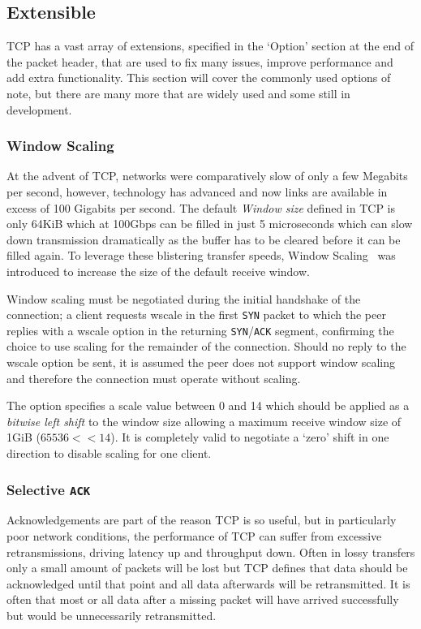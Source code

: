 \documentclass[11pt,a4paper,british]{bhamarticle}
\begin{document}
\begin{multicols}{2}
\subsection{Extensible}
TCP has a vast array of extensions, specified in the `Option' section at the end of the packet header, that are used to fix many issues, improve performance and add extra functionality. This section will cover the commonly used options of note, but there are many more that are widely used and some still in development.

\subsubsection{Window Scaling}\label{sec:wscale}
At the advent of TCP, networks were comparatively slow of only a few Megabits per second, however, technology has advanced and now links are available in excess of 100 Gigabits per second. The default \textit{Window size} defined in TCP is only 64KiB which at 100Gbps can be filled in just 5 microseconds which can slow down transmission dramatically as the buffer has to be cleared before it can be filled again. To leverage these blistering transfer speeds, Window Scaling~\cite[2]{rfc1323} was introduced to increase the size of the default receive window. 

Window scaling must be negotiated during the initial handshake of the connection; a client requests wscale in the first \texttt{SYN} packet to which the peer replies with a wscale option in the returning \texttt{SYN}/\texttt{ACK} segment, confirming the choice to use scaling for the remainder of the connection. Should no reply to the wscale option be sent, it is assumed the peer does not support window scaling and therefore the connection must operate without scaling.

The option specifies a scale value between 0 and 14 which should be applied as a \textit{bitwise left shift} to the window size allowing a maximum receive window size of 1GiB ($65536 << 14$). It is completely valid to negotiate a `zero' shift in one direction to disable scaling for one client.

\subsubsection{Selective \texttt{ACK}}\label{sec:sack}
Acknowledgements are part of the reason TCP is so useful, but in particularly poor network conditions, the performance of TCP can suffer from excessive retransmissions, driving latency up and throughput down. Often in lossy transfers only a small amount of packets will be lost but TCP defines that data should be acknowledged until that point and all data afterwards will be retransmitted. It is often that most or all data after a missing packet will have arrived successfully but would be unnecessarily retransmitted.


\end{multicols}
\end{document}
